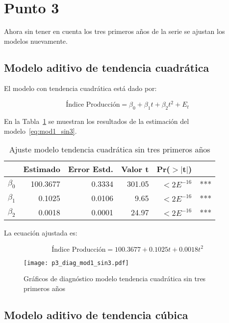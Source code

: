 \documentclass{tufte-handout}
\begin{document}
\section*{Punto 3}

Ahora sin tener en cuenta los tres primeros años de la serie se ajustan los modelos nuevamente.

\subsection*{Modelo aditivo de tendencia cuadrática}

El modelo con tendencia cuadrática está dado por:

\begin{equation} \label{eq:mod1_sin3}
	\text{Índice Producción} = \beta_0 + \beta_1 t + \beta_2 t^2 + E_t
\end{equation}

En la Tabla~\ref{tab:mod1_sin3} se muestran los resultados de la estimación del modelo~\ref{eq:mod1_sin3}.

\begin{table}[ht]
\centering
\begin{tabular}{lrrrrl}
            & Estimado & Error Estd. & Valor t & Pr($>$$|$t$|$) & \\ 
  \hline
  $\beta_0$ & 100.3677 & 0.3334 & 301.05 & $< 2E^{-16}$ & *** \\ 
  $\beta_1$ & 0.1025 & 0.0106 & 9.65 & $< 2E^{-16}$ & *** \\ 
  $\beta_2$ & 0.0018 & 0.0001 & 24.97 & $< 2E^{-16}$ & *** \\ 
   \hline
\end{tabular}
\caption{Ajuste modelo tendencia cuadrática sin tres primeros años} 
\label{tab:mod1_sin3}
\end{table}

La ecuación ajustada es:

\begin{equation}
	\text{Índice Producción} = 100.3677 + 0.1025 t + 0.0018 t^2
\end{equation}

\begin{figure*}[!ht]
    \texttt{[image: p3\_diag\_mod1\_sin3.pdf]}
    \caption{Gráficos de diagnóstico modelo tendencia cuadrática sin tres primeros años}
    \label{fig:p3_diag_mod1_sin3.pdf}
\end{figure*}

\subsection*{Modelo aditivo de tendencia cúbica}
\end{document}

